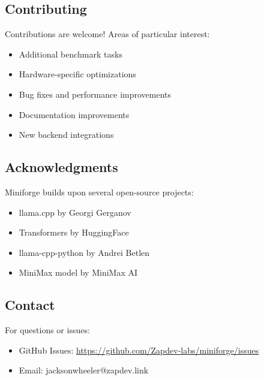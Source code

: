 \subsection{Contributing}

Contributions are welcome! Areas of particular interest:

\begin{itemize}
    \item Additional benchmark tasks
    \item Hardware-specific optimizations
    \item Bug fixes and performance improvements
    \item Documentation improvements
    \item New backend integrations
\end{itemize}

\subsection{Acknowledgments}

Miniforge builds upon several open-source projects:

\begin{itemize}
    \item llama.cpp by Georgi Gerganov
    \item Transformers by HuggingFace
    \item llama-cpp-python by Andrei Betlen
    \item MiniMax model by MiniMax AI
\end{itemize}

\subsection{Contact}

For questions or issues:

\begin{itemize}
    \item GitHub Issues: \url{https://github.com/Zapdev-labs/miniforge/issues}
    \item Email: jacksonwheeler@zapdev.link
\end{itemize}
